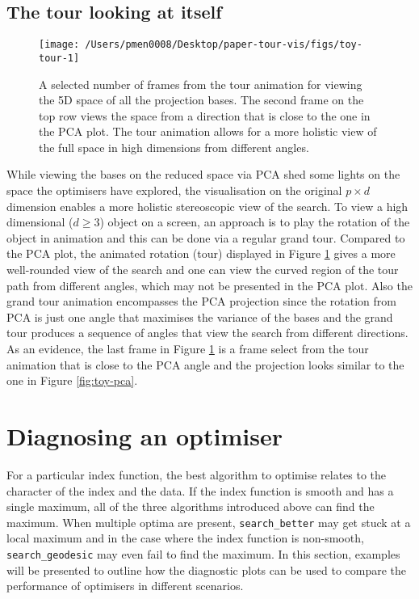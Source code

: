 \documentclass[12pt]{article}
\begin{document}
\hypertarget{the-tour-looking-at-itself}{%
\subsection{The tour looking at itself}\label{the-tour-looking-at-itself}}

\begin{figure}

{\centering \texttt{[image: /Users/pmen0008/Desktop/paper-tour-vis/figs/toy-tour-1]} 

}

\caption{A selected number of frames from the tour animation for viewing the 5D space of all the projection bases. The second frame on the top row views the space from a direction that is close to the one in the PCA plot. The tour animation allows for a more holistic view of the full space in high dimensions from different angles.}\label{fig:toy-tour}
\end{figure}



While viewing the bases on the reduced space via PCA shed some lights on the space the optimisers have explored, the visualisation on the original \(p \times d\) dimension enables a more holistic stereoscopic view of the search. To view a high dimensional (\(d \ge 3\)) object on a screen, an approach is to play the rotation of the object in animation and this can be done via a regular grand tour. Compared to the PCA plot, the animated rotation (tour) displayed in Figure \ref{fig:toy-tour} gives a more well-rounded view of the search and one can view the curved region of the tour path from different angles, which may not be presented in the PCA plot. Also the grand tour animation encompasses the PCA projection since the rotation from PCA is just one angle that maximises the variance of the bases and the grand tour produces a sequence of angles that view the search from different directions. As an evidence, the last frame in Figure \ref{fig:toy-tour} is a frame select from the tour animation that is close to the PCA angle and the projection looks similar to the one in Figure \ref{fig:toy-pca}.

\hypertarget{application}{%
\section{Diagnosing an optimiser}\label{application}}

For a particular index function, the best algorithm to optimise relates to the character of the index and the data. If the index function is smooth and has a single maximum, all of the three algorithms introduced above can find the maximum. When multiple optima are present, \texttt{search\_better} may get stuck at a local maximum and in the case where the index function is non-smooth, \texttt{search\_geodesic} may even fail to find the maximum. In this section, examples will be presented to outline how the diagnostic plots can be used to compare the performance of optimisers in different scenarios.
\end{document}

